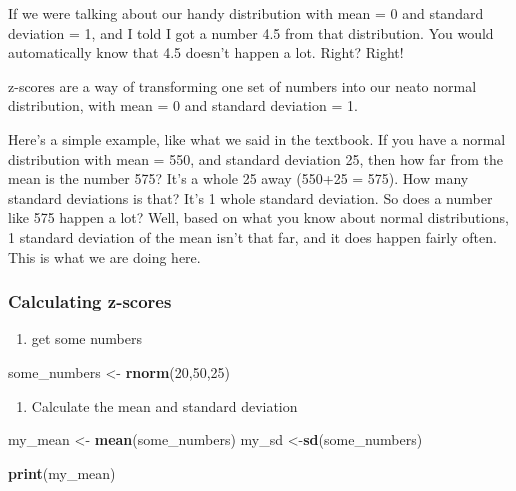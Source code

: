 \documentclass[]{book}
\newenvironment{Shaded}{\begin{snugshade}}{\end{snugshade}}
\newcommand{\KeywordTok}[1]{\textcolor[rgb]{0.13,0.29,0.53}{\textbf{#1}}}
\newcommand{\DecValTok}[1]{\textcolor[rgb]{0.00,0.00,0.81}{#1}}
\newcommand{\StringTok}[1]{\textcolor[rgb]{0.31,0.60,0.02}{#1}}
\newcommand{\NormalTok}[1]{#1}
\providecommand{\tightlist}{%
  \setlength{\itemsep}{0pt}\setlength{\parskip}{0pt}}
\begin{document}
If we were talking about our handy distribution with mean = 0 and
standard deviation = 1, and I told I got a number 4.5 from that
distribution. You would automatically know that 4.5 doesn't happen a
lot. Right? Right!

z-scores are a way of transforming one set of numbers into our neato
normal distribution, with mean = 0 and standard deviation = 1.

Here's a simple example, like what we said in the textbook. If you have
a normal distribution with mean = 550, and standard deviation 25, then
how far from the mean is the number 575? It's a whole 25 away (550+25 =
575). How many standard deviations is that? It's 1 whole standard
deviation. So does a number like 575 happen a lot? Well, based on what
you know about normal distributions, 1 standard deviation of the mean
isn't that far, and it does happen fairly often. This is what we are
doing here.

\subsubsection{Calculating z-scores}\label{calculating-z-scores}

\begin{enumerate}
\def\labelenumi{\arabic{enumi}.}
\tightlist
\item
  get some numbers
\end{enumerate}

\begin{Shaded}
\begin{Highlighting}[]
\NormalTok{some_numbers <-}\StringTok{ }\KeywordTok{rnorm}\NormalTok{(}\DecValTok{20}\NormalTok{,}\DecValTok{50}\NormalTok{,}\DecValTok{25}\NormalTok{)}
\end{Highlighting}
\end{Shaded}

\begin{enumerate}
\def\labelenumi{\arabic{enumi}.}
\setcounter{enumi}{1}
\tightlist
\item
  Calculate the mean and standard deviation
\end{enumerate}

\begin{Shaded}
\begin{Highlighting}[]
\NormalTok{my_mean <-}\StringTok{ }\KeywordTok{mean}\NormalTok{(some_numbers)}
\NormalTok{my_sd <-}\KeywordTok{sd}\NormalTok{(some_numbers)}

\KeywordTok{print}\NormalTok{(my_mean)}
\end{Highlighting}
\end{Shaded}
\end{document}
